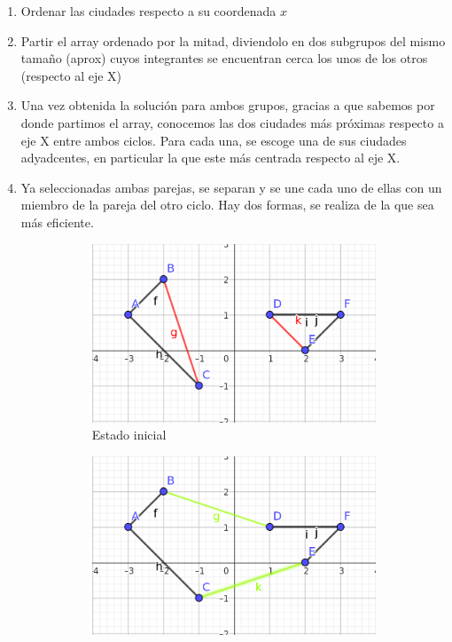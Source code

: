 \documentclass{article}
\begin{document}
\begin{enumerate}
    \item Ordenar las ciudades respecto a su coordenada $x$
    \item Partir el array ordenado por la mitad, diviendolo en dos subgrupos del mismo tamaño (aprox) cuyos integrantes se encuentran cerca los unos de los otros (respecto al eje X)
    \item Una vez obtenida la solución para ambos grupos, gracias a que sabemos por donde partimos el array, conocemos las dos ciudades más próximas respecto a eje X entre ambos ciclos. Para cada una, se escoge una de sus ciudades adyadcentes, en particular la que este más centrada respecto al eje X.
    \item Ya seleccionadas ambas parejas, se separan y se une cada uno de ellas con un miembro de la pareja del otro ciclo. Hay dos formas, se realiza de la que sea más eficiente.
    \begin{figure}[H]
    \centering
    \begin{subfigure}[b]{0.3\textwidth}
        \centering
        \includegraphics[width=\textwidth]{P3/Prosa/ej_unir0.png}
        \caption{\centering Estado inicial}
        \label{fig:p3_ejemplo}
    \end{subfigure}
    \hfill
    \begin{subfigure}[b]{0.3\textwidth}
        \centering
        \includegraphics[width=\textwidth]{P3/Prosa/ej_unir1.png}

\end{subfigure}
\end{figure}
\end{enumerate}
\end{document}
